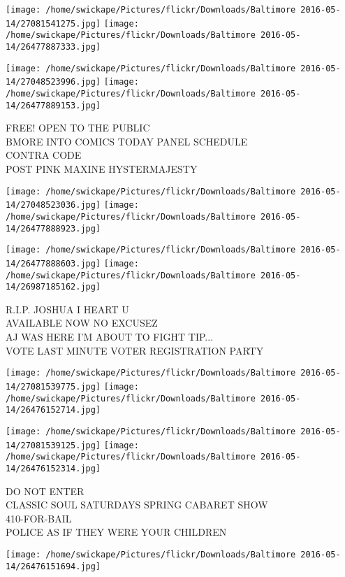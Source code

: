 \documentclass[10pt,letterpaper]{article}
\begin{document}
\texttt{[image: /home/swickape/Pictures/flickr/Downloads/Baltimore 2016-05-14/27081541275.jpg]}
\texttt{[image: /home/swickape/Pictures/flickr/Downloads/Baltimore 2016-05-14/26477887333.jpg]}

\texttt{[image: /home/swickape/Pictures/flickr/Downloads/Baltimore 2016-05-14/27048523996.jpg]}
\texttt{[image: /home/swickape/Pictures/flickr/Downloads/Baltimore 2016-05-14/26477889153.jpg]}

FREE!  OPEN TO THE PUBLIC\\
BMORE INTO COMICS TODAY PANEL SCHEDULE\\
CONTRA CODE\\
POST PINK MAXINE HYSTERMAJESTY
\pagebreak

\texttt{[image: /home/swickape/Pictures/flickr/Downloads/Baltimore 2016-05-14/27048523036.jpg]}
\texttt{[image: /home/swickape/Pictures/flickr/Downloads/Baltimore 2016-05-14/26477888923.jpg]}

\texttt{[image: /home/swickape/Pictures/flickr/Downloads/Baltimore 2016-05-14/26477888603.jpg]}
\texttt{[image: /home/swickape/Pictures/flickr/Downloads/Baltimore 2016-05-14/26987185162.jpg]}

R.I.P. JOSHUA I HEART U\\
AVAILABLE NOW NO EXCUSEZ\\
AJ WAS HERE I'M ABOUT TO FIGHT TIP...\\
VOTE LAST MINUTE VOTER REGISTRATION PARTY
\pagebreak

\texttt{[image: /home/swickape/Pictures/flickr/Downloads/Baltimore 2016-05-14/27081539775.jpg]}
\texttt{[image: /home/swickape/Pictures/flickr/Downloads/Baltimore 2016-05-14/26476152714.jpg]}

\texttt{[image: /home/swickape/Pictures/flickr/Downloads/Baltimore 2016-05-14/27081539125.jpg]}
\texttt{[image: /home/swickape/Pictures/flickr/Downloads/Baltimore 2016-05-14/26476152314.jpg]}

DO NOT ENTER\\
CLASSIC SOUL SATURDAYS SPRING CABARET SHOW\\
410{-}FOR{-}BAIL\\
POLICE AS IF THEY WERE YOUR CHILDREN
\pagebreak

\texttt{[image: /home/swickape/Pictures/flickr/Downloads/Baltimore 2016-05-14/26476151694.jpg]}
\end{document}
